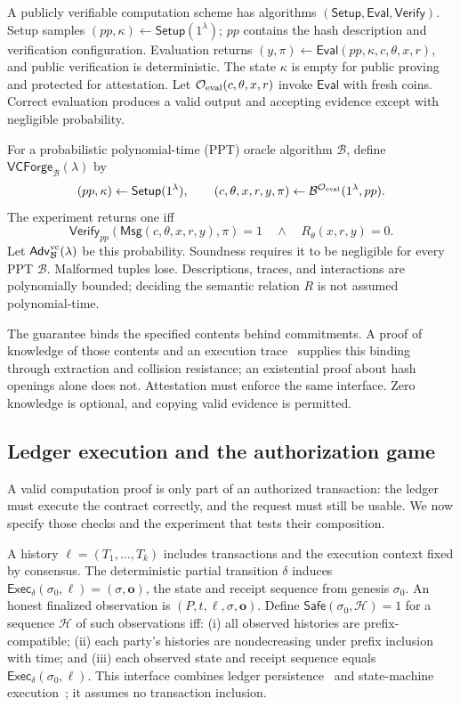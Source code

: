 \documentclass[runningheads,orivec]{llncs}
\newcommand{\Setup}{\mathsf{Setup}}
\newcommand{\Eval}{\mathsf{Eval}}
\newcommand{\Verify}{\mathsf{Verify}}
\newcommand{\Msg}{\mathsf{Msg}}
\newcommand{\Safe}{\mathsf{Safe}}
\newcommand{\Exec}{\mathsf{Exec}}
\newcommand{\Adv}{\mathsf{Adv}}
\newcommand{\EvalO}{\mathcal O_{\rm eval}}
\begin{document}
A publicly verifiable computation scheme has algorithms $(\Setup,\Eval,\Verify)$. Setup samples $(pp,\kappa)\leftarrow\Setup(1^\lambda)$; $pp$ contains the hash description and verification configuration. Evaluation returns $(y,\pi)\leftarrow\Eval(pp,\kappa,c,\theta,x,r)$, and public verification is deterministic. The state $\kappa$ is empty for public proving and protected for attestation. Let $\EvalO(c,\theta,x,r)$ invoke $\Eval$ with fresh coins. Correct evaluation produces a valid output and accepting evidence except with negligible probability.

\begin{definition}\label{def:vc}
For a probabilistic polynomial-time (PPT) oracle algorithm $\mathcal B$, define $\mathsf{VCForge}_{\mathcal B}(\lambda)$ by
\[
 (pp,\kappa)\leftarrow\Setup(1^\lambda),\qquad
 (c,\theta,x,r,y,\pi)\leftarrow\mathcal B^{\EvalO}(1^\lambda,pp).
\]
The experiment returns one iff
\[
 \Verify_{pp}(\Msg(c,\theta,x,r,y),\pi)=1
 \quad\land\quad R_\theta(x,r,y)=0.
\]
Let $\Adv^{\rm vc}_{\mathcal B}(\lambda)$ be this probability. Soundness requires it to be negligible for every PPT $\mathcal B$. Malformed tuples lose. Descriptions, traces, and interactions are polynomially bounded; deciding the semantic relation $R$ is not assumed polynomial-time.
\end{definition}
The guarantee binds the specified contents behind commitments. A proof of knowledge of those contents and an execution trace~\cite{commitprove2020} supplies this binding through extraction and collision resistance; an existential proof about hash openings alone does not. Attestation must enforce the same interface. Zero knowledge is optional, and copying valid evidence is permitted.

\subsection{Ledger execution and the authorization game}
A valid computation proof is only part of an authorized transaction: the ledger must execute the contract correctly, and the request must still be usable. We now specify those checks and the experiment that tests their composition.

A history $\ell=(T_1,\ldots,T_k)$ includes transactions and the execution context fixed by consensus. The deterministic partial transition $\delta$ induces $\Exec_\delta(\sigma_0,\ell)=(\sigma,\mathbf o)$, the state and receipt sequence from genesis $\sigma_0$. An honest finalized observation is $(P,t,\ell,\sigma,\mathbf o)$. Define $\Safe(\sigma_0,\mathcal H)=1$ for a sequence $\mathcal H$ of such observations iff: (i) all observed histories are prefix-compatible; (ii) each party's histories are nondecreasing under prefix inclusion with time; and (iii) each observed state and receipt sequence equals $\Exec_\delta(\sigma_0,\ell)$. This interface combines ledger persistence~\cite{garay2015} and state-machine execution~\cite{castro1999}; it assumes no transaction inclusion.
\end{document}
